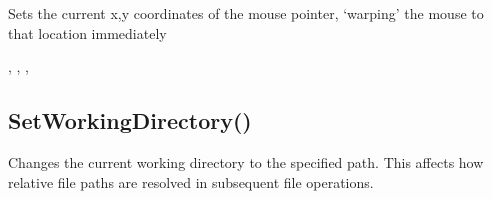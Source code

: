 \documentclass[letterpaper,10pt,english]{sphinxmanual}
\begin{document}
\sphinxAtStartPar
Sets the current x,y coordinates of the mouse   pointer, ‘warping’ the mouse to that location immediately

\sphinxAtStartPar
{}

\begin{sphinxVerbatim}[commandchars=\\\{\}]
\end{sphinxVerbatim}

\sphinxAtStartPar
{}

\begin{sphinxVerbatim}[commandchars=\\\{\}]
\end{sphinxVerbatim}

\sphinxAtStartPar
{}

\sphinxAtStartPar
{}, ,   , 

\ignorespaces 

\subsection{SetWorkingDirectory()}
\label{\detokenize{reference/peblenvironment:setworkingdirectory}}\label{\detokenize{reference/peblenvironment:index-58}}
\sphinxAtStartPar
{}

\sphinxAtStartPar
{}

\sphinxAtStartPar
Changes the current working directory to the specified path. This affects how relative file paths are resolved in subsequent file operations.

\sphinxAtStartPar
{}

\begin{sphinxVerbatim}[commandchars=\\\{\}]
\end{sphinxVerbatim}
\end{document}
